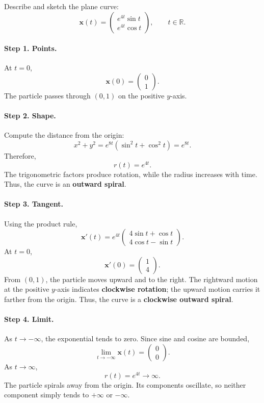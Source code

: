 \documentclass[11pt,letterpaper]{article}
\begin{document}
\begin{example}[7]{
Describe and sketch the plane curve:
\[
\mathbf{x}(t)=
\begin{pmatrix}
e^{4t}\sin t\\
e^{4t}\cos t
\end{pmatrix},
\qquad t\in\mathbb R.
\]
}

\paragraph{Step 1. Points.}
At $t=0$,
\[
\mathbf{x}(0)=
\begin{pmatrix}0\\1\end{pmatrix}.
\]
The particle passes through $(0,1)$ on the positive
$y$-axis.

\paragraph{Step 2. Shape.}
Compute the distance from the origin:
\[
x^2+y^2
=e^{8t}(\sin^2t+\cos^2t)=e^{8t}.
\]
Therefore,
\[
\boxed{r(t)=e^{4t}.}
\]
The trigonometric factors produce rotation, while
the radius increases with time. Thus, the curve
is an \textbf{outward spiral}.

\paragraph{Step 3. Tangent.}
Using the product rule,
\[
\mathbf{x}'(t)=e^{4t}
\begin{pmatrix}
4\sin t+\cos t\\
4\cos t-\sin t
\end{pmatrix}.
\]
At $t=0$,
\[
\mathbf{x}'(0)=
\begin{pmatrix}1\\4\end{pmatrix}.
\]
From $(0,1)$, the particle moves upward and to the
right. The rightward motion at the positive $y$-axis
indicates \textbf{clockwise rotation}; the upward
motion carries it farther from the origin. Thus, the curve is a \textbf{clockwise outward spiral}.

\paragraph{Step 4. Limit.}
As $t\to-\infty$, the exponential tends to zero.
Since sine and cosine are bounded,
\[
\lim_{t\to-\infty}\mathbf{x}(t)
=\begin{pmatrix}0\\0\end{pmatrix}.
\]
As $t\to\infty$,
\[
r(t)=e^{4t}\to\infty.
\]
The particle spirals away from the origin.
Its components oscillate, so neither component
simply tends to $+\infty$ or $-\infty$.


\end{example}
\end{document}
